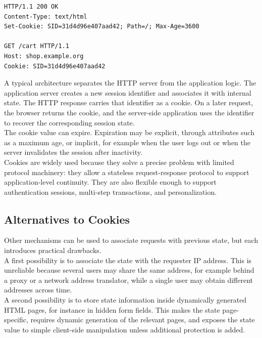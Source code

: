 \documentclass{scrbook}
\begin{document}
\begin{lstlisting}
HTTP/1.1 200 OK
Content-Type: text/html
Set-Cookie: SID=31d4d96e407aad42; Path=/; Max-Age=3600

GET /cart HTTP/1.1
Host: shop.example.org
Cookie: SID=31d4d96e407aad42
\end{lstlisting}

A typical architecture separates the HTTP server from the application logic. The application server creates a new session identifier and associates it with internal state. The HTTP response carries that identifier as a cookie. On a later request, the browser returns the cookie, and the server-side application uses the identifier to recover the corresponding session state.\\

The cookie value can expire. Expiration may be explicit, through attributes such as a maximum age, or implicit, for example when the user logs out or when the server invalidates the session after inactivity.\\

Cookies are widely used because they solve a precise problem with limited protocol machinery: they allow a stateless request-response protocol to support application-level continuity. They are also flexible enough to support authentication sessions, multi-step transactions, and personalization.

\subsection{Alternatives to Cookies}

Other mechanisms can be used to associate requests with previous state, but each introduces practical drawbacks.\\

A first possibility is to associate the state with the requester IP address. This is unreliable because several users may share the same address, for example behind a proxy or a network address translator, while a single user may obtain different addresses across time.\\

A second possibility is to store state information inside dynamically generated HTML pages, for instance in hidden form fields. This makes the state page-specific, requires dynamic generation of the relevant pages, and exposes the state value to simple client-side manipulation unless additional protection is added.\\
\end{document}
